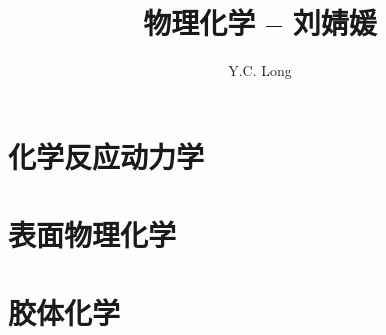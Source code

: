 \documentclass[a4paper]{ctexrep}
\author{Y.C. Long}
\title{物理化学 -- 刘婧媛}
\begin{document}
    \maketitle
    \tableofcontents

    
    
    

    \chapter{化学反应动力学}

    \chapter{表面物理化学}

    \chapter{胶体化学}
\end{document}
